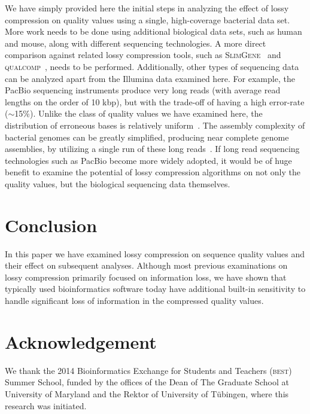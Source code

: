 \documentclass{bioinfo}
\begin{document}
We have simply provided here the initial steps in analyzing the effect
of lossy compression on quality values using a single,
high-coverage bacterial data set. More work needs to be done using
additional biological data sets, such as human and mouse, along with
different sequencing technologies. A more direct comparison against
related lossy compression tools, such as
\textsc{SlimGene}~\citep{Kozanitis:2011kl} and
\textsc{\textsc{q}ual\textsc{c}omp}~\citep{Ochoa:2013rt}, needs to be
performed. Additionally, other types of sequencing data can be
analyzed apart from the Illumina data examined here. For example, the
PacBio sequencing instruments produce very long reads (with average
read lengths on the order of 10 kbp), but with the trade-off of having
a high error-rate ($\sim$15\%). Unlike the class of quality values we
have examined here, the distribution of erroneous bases is relatively
uniform~\cite{Ferrarini:2013vf}. The assembly complexity of bacterial
genomes can be greatly simplified, producing near complete genome
assemblies, by utilizing a single run of these long
reads~\citep{Koren:2013ye}. If long read sequencing technologies such
as PacBio become more widely adopted, it would be of huge benefit to
examine the potential of lossy compression algorithms on not only the
quality values, but the biological sequencing data themselves.


%
%

\section{Conclusion}

In this paper we have examined lossy compression on sequence quality
values and their effect on subsequent analyses. Although most previous
examinations on lossy compression primarily focused on information
loss, we have shown that typically used bioinformatics software today
have additional built-in sensitivity to handle significant loss of
information in the compressed quality values.

\section*{Acknowledgement}
We thank the 2014 Bioinformatics
Exchange for Students and Teachers (\textsc{best}) Summer School, 
funded by the offices of the Dean of The Graduate School at University
of Maryland and the Rektor of University of T\"{u}bingen, where this 
research was initiated.






%

%


\end{document}
